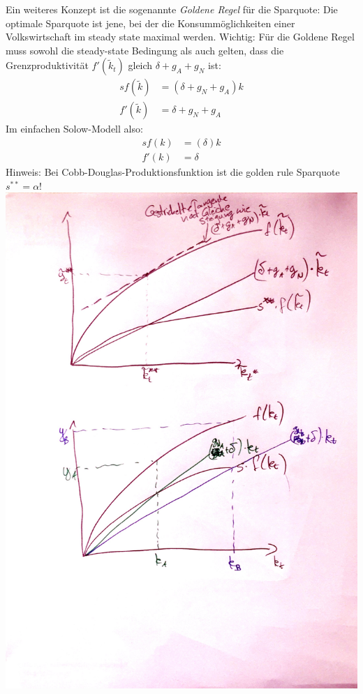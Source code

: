 \documentclass{scrartcl}
\begin{document}
Ein weiteres Konzept ist die sogenannte \emph{Goldene Regel} f\"{u}r die Sparquote: Die optimale Sparquote ist jene, bei der die Konsumm\"{o}glichkeiten einer Volkswirtschaft im steady state maximal werden. Wichtig: F\"{u}r die Goldene Regel muss sowohl die steady-state Bedingung als auch gelten, dass die Grenzproduktivit\"{a}t $f'(\tilde{k}_t)$ gleich $\delta+g_A+g_N$ ist:
\begin{align*}
  sf(\tilde{k}) &= (\delta + g_N + g_A)k\\
  f'(\tilde{k}) & = \delta + g_N + g_A
\end{align*}
Im einfachen Solow-Modell also:
\begin{align*}
  sf({k}) &= (\delta)k\\
  f'({k}) & = \delta
\end{align*}
Hinweis: Bei Cobb-Douglas-Produktionsfunktion ist die golden rule Sparquote $s^{**}=\alpha$!
\includegraphics[width=\textwidth,keepaspectratio]{Bilder/SolowGoldenRule.pdf}
\end{document}
